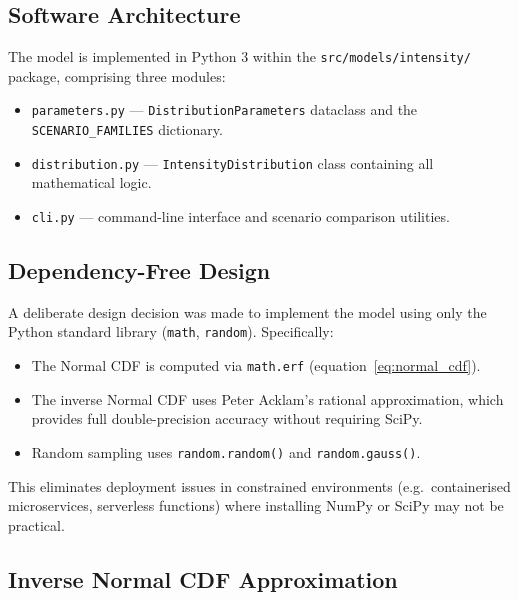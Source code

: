 \documentclass[11pt,a4paper]{article}
\begin{document}
\subsection{Software Architecture}

The model is implemented in Python 3 within the \texttt{src/models/intensity/}
package, comprising three modules:

\begin{itemize}[nosep]
    \item \texttt{parameters.py} --- \texttt{DistributionParameters} dataclass and
          the \texttt{SCENARIO\_FAMILIES} dictionary.
    \item \texttt{distribution.py} --- \texttt{IntensityDistribution} class containing
          all mathematical logic.
    \item \texttt{cli.py} --- command-line interface and scenario comparison utilities.
\end{itemize}

\subsection{Dependency-Free Design}

A deliberate design decision was made to implement the model using only the Python
standard library (\texttt{math}, \texttt{random}). Specifically:

\begin{itemize}[nosep]
    \item The Normal CDF is computed via \texttt{math.erf} (equation~\ref{eq:normal_cdf}).
    \item The inverse Normal CDF uses Peter Acklam's rational approximation, which
          provides full double-precision accuracy without requiring SciPy.
    \item Random sampling uses \texttt{random.random()} and \texttt{random.gauss()}.
\end{itemize}

\noindent This eliminates deployment issues in constrained environments (e.g.\
containerised microservices, serverless functions) where installing NumPy or SciPy
may not be practical.

\subsection{Inverse Normal CDF Approximation}
\end{document}
